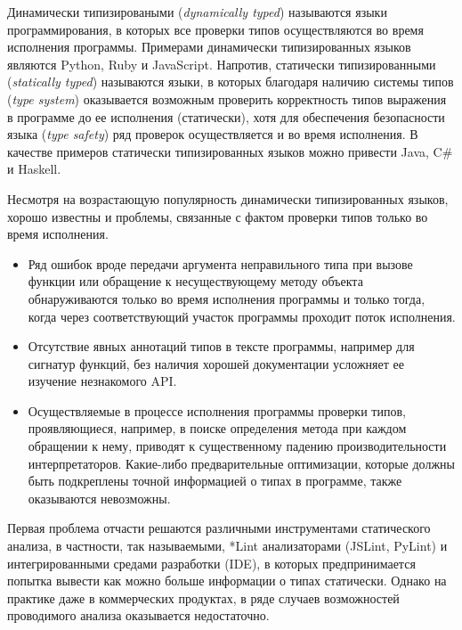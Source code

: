 \intro

Динамически типизироваными (\emph{dynamically typed}) называются языки
программирования, в которых все проверки типов осуществляются во время
исполнения программы. Примерами динамически типизированных языков являются
Python, Ruby и JavaScript.  Напротив, статически типизированными
(\emph{statically typed}) называются языки, в которых благодаря наличию системы
типов (\emph{type system}) оказывается возможным проверить корректность типов
выражения в программе до ее исполнения (статически), хотя для обеспечения
безопасности языка (\emph{type safety}) ряд проверок осуществляется и во время
исполнения.  В качестве примеров статически типизированных языков можно привести
Java, C\# и Haskell.

Несмотря на возрастающую популярность динамически типизированных языков,
хорошо известны и проблемы, связанные с фактом проверки типов только во время
исполнения.

\begin{itemize}
  \item{%
      Ряд ошибок вроде передачи аргумента неправильного типа при вызове
      функции или обращение к несуществующему методу объекта обнаруживаются
      только во время исполнения программы и только тогда, когда через
      соответствующий участок программы проходит поток исполнения.
    }
  \item{%
      Отсутствие явных аннотаций типов в тексте программы, например для сигнатур
      функций, без наличия хорошей документации усложняет ее изучение
      незнакомого API.
    }
  \item{%
      Осуществляемые в процессе исполнения программы проверки типов,
      проявляющиеся, например, в поиске определения метода при каждом обращении
      к нему, приводят к существенному падению производительности
      интерпретаторов. Какие-либо предварительные оптимизации, которые
      должны быть подкреплены точной информацией о типах в программе, также
      оказываются невозможны. 
    }
\end{itemize}

Первая проблема отчасти решаются различными инструментами статического
анализа, в частности, так называемыми, *Lint анализаторами (JSLint, PyLint) и
интегрированными средами разработки (IDE), в которых предпринимается попытка
вывести как можно больше информации о типах статически.  Однако на практике даже
в коммерческих продуктах, в ряде случаев возможностей проводимого анализа
оказывается недостаточно.

